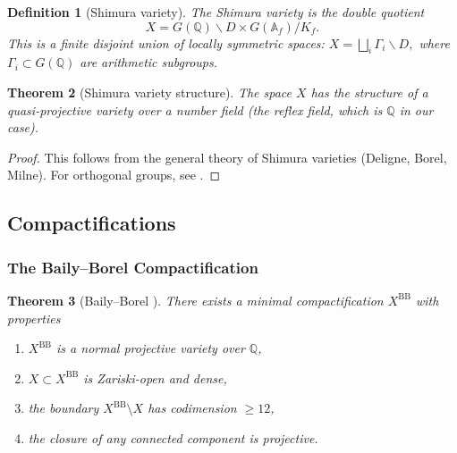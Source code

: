 \documentclass[12pt]{amsart}
\newtheorem{theorem}{Theorem}[section]
\newtheorem{definition}[theorem]{Definition}
\theoremstyle{definition}
\newcommand{\A}{\mathbb{A}}
\newcommand{\Q}{\mathbb{Q}}
\begin{document}
\begin{definition}[Shimura variety]
The Shimura variety is the double quotient
\[
X = G(\Q) \backslash D \times G(\A_f) / K_f.
\]
This is a finite disjoint union of locally symmetric spaces: $X = \bigsqcup_i \Gamma_i \backslash D,$ where $\Gamma_i \subset G(\Q)$ are arithmetic subgroups.
\end{definition}

\begin{theorem}[Shimura variety structure]
The space $X$ has the structure of a quasi-projective variety over a number field (the reflex field, which is $\Q$ in our case).
\end{theorem}
\begin{proof}
This follows from the general theory of Shimura varieties (Deligne, Borel, Milne). For orthogonal groups, see \cite{Milne-Shimura}.
\end{proof}

\subsection{Compactifications}

\subsubsection{The Baily--Borel Compactification}

\begin{theorem}[Baily--Borel \cite{Baily-Borel}]
There exists a minimal compactification $X^{\mathrm{BB}}$ with properties
\begin{enumerate}
\item $X^{\mathrm{BB}}$ is a normal projective variety over $\Q$,
\item $X \subset X^{\mathrm{BB}}$ is Zariski-open and dense,
\item the boundary $X^{\mathrm{BB}} \setminus X$ has codimension $\geq 12$,
\item the closure of any connected component is projective.
\end{enumerate}
\end{theorem}
\end{document}
